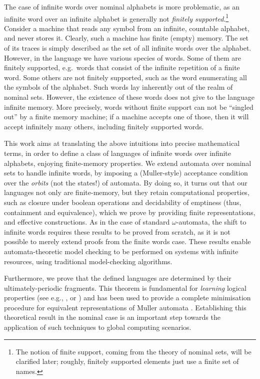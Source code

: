 The case of infinite words over nominal alphabets is more problematic, as an infinite word over an infinite alphabet is generally not \emph{finitely supported}.\footnote{The notion of finite support, coming from the theory of nominal sets, will be clarified later; roughly, finitely supported elements just use a finite set of names.} Consider a machine that reads any symbol from an infinite, countable alphabet, and never stores it. Clearly, such a machine has finite (empty) memory. The set of its traces is simply described as the set of all infinite words over the alphabet. However, in the language we have various species of words. Some of them are finitely supported, e.g.\ words that consist of the infinite repetition of a finite word. Some others are not finitely supported, such as the word enumerating all the symbols of the alphabet. Such words lay inherently out of the realm of nominal sets. However, the existence of these words does not give to the language infinite memory. More precisely,  words without finite support can not be ``singled out'' by a finite memory machine; if a machine accepts one of those, then it will accept infinitely many others, including finitely supported words.  

This work aims at translating the above intuitions into precise mathematical terms, in order to define a class of languages of infinite words over infinite alphabets, enjoying finite-memory properties. We extend automata over nominal sets to handle infinite words, by imposing a (Muller-style) acceptance condition 
over the \emph{orbits} (not the states!) of automata. By doing so, it turns out that our languages not only are finite-memory, but they retain computational properties, such as closure under boolean operations and decidability of emptiness (thus, containment and equivalence), which we prove by providing finite representations, and effective constructions. As in the case of standard $\omega$-automata, the shift to infinite words requires these results to be proved from scratch, as it is not possible to merely extend proofs from the finite words case. These results enable automata-theoretic model checking to be performed on systems with infinite resources, using traditional model-checking algorithms. 

Furthermore, we prove that the defined languages are determined by their ultimately-periodic fragments. This theorem is fundamental for \emph{learning} logical properties (see e.g., \cite{MP95}, or \cite{FCCTW08}) and has been used to provide a complete minimisation procedure for equivalent representations of Muller automata \cite{CV12}. Establishing this theoretical result in the nominal case is an important step towards the application of such techniques to global computing scenarios.

